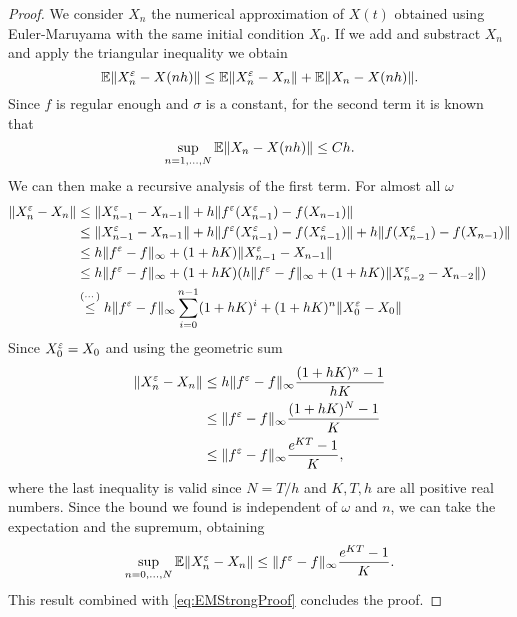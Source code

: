 \begin{proof} We consider $X_n$ the numerical approximation of $X(t)$ obtained using Euler-Maruyama with the same initial condition $X_0$. If we add and substract $X_n$ and apply the triangular inequality we obtain
\begin{equation*}
	\mathbb{E} \|X_n^\varepsilon - X(nh)\| \leq \mathbb{E} \|X_n^\varepsilon - X_n\| + \mathbb{E} \|X_n - X(nh)\|. \\
\end{equation*}
Since $f$ is regular enough and $\sigma$ is a constant, for the second term it is known that
\begin{equation}\label{eq:EMStrongProof}
	\sup_{n = 1, \dots, N} \mathbb{E} \|X_n - X(nh)\| \leq C h.
\end{equation}
We can then make a recursive analysis of the first term. For almost all $\omega$
\begin{equation*}
\begin{aligned}
	\|X^\varepsilon_n - X_n\| &\leq \|X_{n-1}^\varepsilon - X_{n-1}\| + h\|f^\varepsilon(X^\varepsilon_{n-1}) - f(X_{n-1})\|  \\
	&\leq \|X_{n-1}^\varepsilon - X_{n-1}\| + h\|f^\varepsilon(X^\varepsilon_{n-1}) - f(X^\varepsilon_{n-1})\| + h\|f(X^\varepsilon_{n-1}) - f(X_{n-1})\| \\
	&\leq h  \|f^\varepsilon - f\|_{\infty} + (1 + hK) \|X_{n-1}^\varepsilon - X_{n-1}\| \\
	&\leq h  \|f^\varepsilon - f\|_{\infty} + (1 + hK) (h  \|f^\varepsilon - f\|_{\infty} + (1 + hK)\|X_{n-2}^\varepsilon - X_{n-2}\|) \\
	&\stackrel{(\cdots)}{\leq} h  \|f^\varepsilon - f\|_{\infty} \sum_{i = 0}^{n-1} (1 + hK)^i + (1 + hK)^n \|X_0^\varepsilon - X_0\|
\end{aligned}
\end{equation*}
Since $X_0^\varepsilon = X_0$ and using the geometric sum
\begin{equation*}
\begin{aligned}
	\|X^\varepsilon_n - X_n\| &\leq h  \|f^\varepsilon - f\|_{\infty} \frac{(1 + hK)^n - 1}{hK} \\
	&\leq  \|f^\varepsilon - f\|_{\infty} \frac{(1 + hK)^N - 1}{K} \\
	&\leq  \|f^\varepsilon - f\|_{\infty} \frac{e^{KT} - 1}{K},
\end{aligned}
\end{equation*}
where the last inequality is valid since $N = T/h$ and $K, T, h$ are all positive real numbers. Since the bound we found is independent of $\omega$ and $n$, we can take the expectation and the supremum, obtaining
\begin{equation}\label{eq:DiffXeplnXn}
	\sup_{n = 0, \dots, N} \mathbb{E} \|X^\varepsilon_n - X_n\| \leq  \|f^\varepsilon - f\|_{\infty} \frac{e^{KT} - 1}{K}.
\end{equation}
This result combined with \eqref{eq:EMStrongProof} concludes the proof.
\end{proof}
